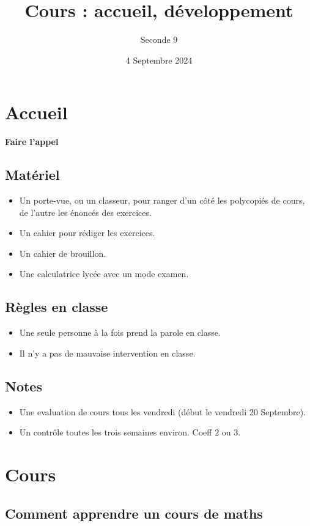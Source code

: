 \documentclass{article}
\author{Seconde 9}
\date{4 Septembre 2024}
\title{Cours : accueil, développement}
\begin{document}
\maketitle

\section{Accueil}
\textbf{Faire l'appel}
\subsection{Matériel}
\begin{itemize}
\item Un porte-vue, ou un classeur, pour ranger d'un côté les polycopiés de cours, de l'autre les énoncés des exercices.
\item Un cahier pour rédiger les exercices.
\item Un cahier de brouillon.
\item Une calculatrice lycée avec un mode examen.
\end{itemize}
\subsection{Règles en classe}
\begin{itemize}
\item Une seule personne à la fois prend la parole en classe.
\item Il n'y a pas de mauvaise intervention en classe.
\end{itemize}
\subsection{Notes}
\begin{itemize}
\item Une evaluation de cours tous les vendredi (début le vendredi 20 Septembre).
\item Un contrôle toutes les trois semaines environ. Coeff $2$ ou $3$.
\end{itemize}
\section{Cours}
\subsection{Comment apprendre un cours de maths}
\end{document}
